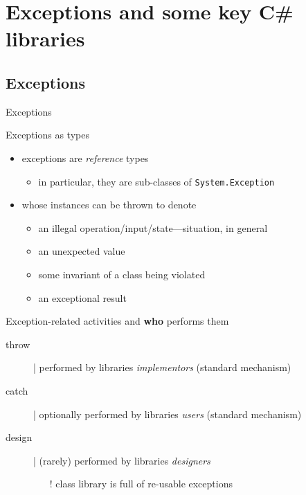 \documentclass[presentation]{beamer}
\begin{document}



\section{Exceptions and some key C\# libraries}
\renewcommand{\codepath}[1]{../../code/lecture-06/#1}

\subsection{Exceptions}

\begin{frame}[shrink=5]{\dotnet{} Exceptions}
  \begin{block}{Exceptions as types}
    \begin{itemize}
      \item \dotnet{} exceptions are \emph{reference} \alert{types}
      \begin{itemize}
        \item in particular, they are sub-classes of \alert{\texttt{System.Exception}}
      \end{itemize}

      \item whose \alert{instances} can be \alert{thrown} to denote
      \begin{itemize}
        \item an illegal operation/input/state---situation, in general
        \item an unexpected value
        \item some invariant of a class being violated
        \item an exceptional result
      \end{itemize}
    \end{itemize}
  \end{block}

  \begin{block}{Exception-related activities and \textbf{who} performs them}
    \begin{description}
      \item[throw] | performed by libraries \emph{implementors} (standard mechanism)
      \item[catch] | optionally performed by libraries \emph{users} (standard mechanism)
      \item[design] | (rarely) performed by libraries \emph{designers}
      \begin{itemize}
        \item[!] \dotnet class library is full of re-usable exceptions
      \end{itemize} 
    \end{description}
  \end{block}
\end{frame}
\end{document}

